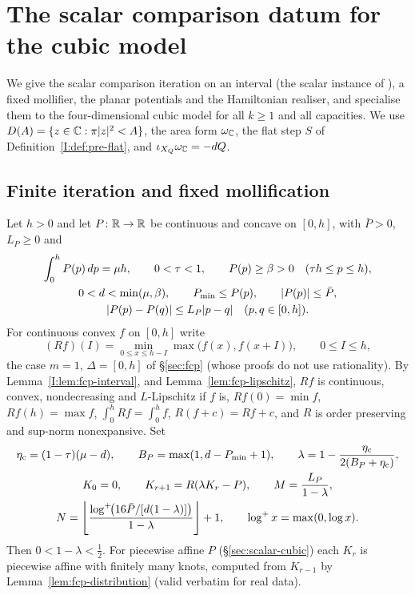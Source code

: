 \section{The scalar comparison datum for the cubic model}\label{sec:scalar-cmp}

We give the scalar comparison iteration on an interval (the scalar instance of \cite[\S2]{OpenAI2026}), a fixed mollifier, the planar potentials and the Hamiltonian realiser, and specialise them to the four-dimensional cubic model for all $k\ge1$ and all capacities. We use $D(A)=\{z\in\mathbb{C}:\pi|z|^2<A\}$, the area form $\omega_{\mathbb{C}}$, the flat step $S$ of Definition~\ref{I:def:pre-flat}, and $\iota_{X_Q}\omega_{\mathbb{C}}=-dQ$.

\subsection{Finite iteration and fixed mollification}\label{sec:scalar-iteration}

Let $h>0$ and let $P\colon\mathbb{R}\to\mathbb{R}$ be continuous and concave on $[0,h]$, with $\bar P>0$, $L_P\ge0$ and
\begin{gather}\label{eq:scalar-input}
 \int_0^hP(p)\,dp=\mu h,\qquad 0<\tau<1,\qquad
 P(p)\ge\beta>0\quad(\tau h\le p\le h),\\
 0<d<\min(\mu,\beta),\qquad P_{\min}\le P(p),\qquad |P(p)|\le\bar P,\notag\\
 |P(p)-P(q)|\le L_P|p-q|\quad(p,q\in[0,h]).\notag
\end{gather}
For continuous convex $f$ on $[0,h]$ write
\begin{equation}\label{eq:scalar-rearrangement}
 (Rf)(I)=\min_{0\le x\le h-I}\max\bigl(f(x),f(x+I)\bigr),\qquad 0\le I\le h,
\end{equation}
the case $m=1$, $\Delta=[0,h]$ of \S\ref{sec:fcp} (whose proofs do not use rationality). By Lemma~\ref{I:lem:fcp-interval},  and Lemma~\ref{lem:fcp-lipschitz}, $Rf$ is continuous, convex, nondecreasing and $L$-Lipschitz if $f$ is, $Rf(0)=\min f$, $Rf(h)=\max f$, $\int_0^hRf=\int_0^hf$, $R(f+c)=Rf+c$, and $R$ is order preserving and sup-norm nonexpansive. Set
\begin{gather}\label{eq:scalar-iteration}
 \eta_{\rm c}=(1-\tau)(\mu-d),\qquad B_P=\max(1,d-P_{\min}+1),\qquad
 \lambda=1-\frac{\eta_{\rm c}}{2(B_P+\eta_{\rm c})},\\
 K_0=0,\qquad K_{r+1}=R(\lambda K_r-P),\qquad
 M=\frac{L_P}{1-\lambda},\notag\\
 N=\left\lfloor\frac{\log^+\!\bigl(16\bar P/[d(1-\lambda)]\bigr)}{1-\lambda}\right\rfloor+1,
 \qquad \log^+x=\max(0,\log x).\notag
\end{gather}
Then $0<1-\lambda<\frac12$. For piecewise affine $P$ (\S\ref{sec:scalar-cubic}) each $K_r$ is piecewise affine with finitely many knots, computed from $K_{r-1}$ by Lemma~\ref{lem:fcp-distribution} (valid verbatim for real data).

